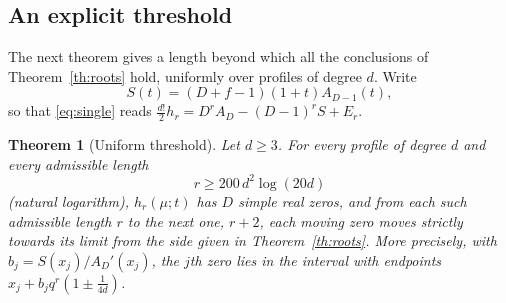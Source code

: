 \documentclass[11pt,a4paper]{article}
\newtheorem{theorem}{Theorem}[section]
\theoremstyle{definition}\newtheorem{definition}[theorem]{Definition}
\theoremstyle{remark}\newtheorem{remark}[theorem]{Remark}\newtheorem{example}[theorem]{Example}
\numberwithin{equation}{section}
\begin{document}
\subsection{An explicit threshold}
The next theorem gives a length beyond which all the conclusions of Theorem~\ref{th:roots} hold, uniformly over profiles of degree $d$. Write
\[
 S(t)=(D+f-1)(1+t)A_{D-1}(t),
\]
so that \eqref{eq:single} reads $\frac{d!}2h_r=D^rA_D-(D-1)^rS+E_r$.

\begin{theorem}[Uniform threshold]\label{th:uniform}
Let $d\ge3$. For every profile of degree $d$ and every admissible length
\[
 r\ge200\,d^2\log(20d)
\]
(natural logarithm), $h_r(\mu;t)$ has $D$ simple real zeros, and from each such admissible length $r$ to the next one, $r+2$, each moving zero moves strictly towards its limit from the side given in Theorem~\ref{th:roots}. More precisely, with $b_j=S(x_j)/A_D'(x_j)$, the $j$th zero lies in the interval with endpoints $x_j+b_jq^r(1\pm\frac1{4d})$.
\end{theorem}
\end{document}
